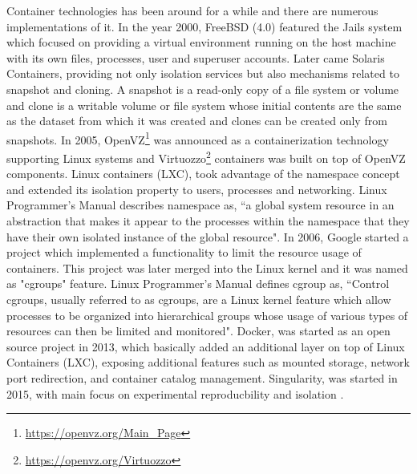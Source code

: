 Container technologies has been around for a while and there are numerous implementations of it. In the year 2000, FreeBSD (4.0) featured the Jails system which focused on providing a virtual environment running on the host machine with its own files, processes, user and superuser accounts. Later came Solaris Containers, providing not only isolation services but also mechanisms related to snapshot and cloning. A snapshot is a read-only copy of a file system or volume and clone is a writable volume or file system whose initial contents are the same as the dataset from which it was created and clones can be created only from snapshots. In 2005, OpenVZ\footnote{\url{https://openvz.org/Main_Page}} was announced as a containerization technology supporting Linux systems and Virtuozzo\footnote{\url{https://openvz.org/Virtuozzo}} containers was built on top of OpenVZ components. Linux containers (LXC), took advantage of the namespace concept and extended its isolation property to users, processes and networking. Linux Programmer's Manual \cite{namespaces} describes namespace as, ``a global system resource in an abstraction that makes it appear to the processes within the namespace that they have their own isolated instance of the global resource". In 2006, Google started a project which implemented a functionality to limit the resource usage of containers. This project was later merged into the Linux kernel and it was named as "cgroups" feature. Linux Programmer's Manual \cite{cgroups} defines cgroup as, ``Control cgroups, usually referred to as cgroups, are a Linux kernel feature which allow processes to be organized into hierarchical groups whose usage of various types of resources can then be limited and monitored". Docker, was started as an open source project in 2013, which basically added an additional layer on top of Linux Containers (LXC), exposing additional features such as mounted storage, network port redirection, and container catalog management. Singularity, was started in 2015, with main focus on experimental reproducbility and isolation \cite{Xavier:2013:PEC:2497369.2497577}.

